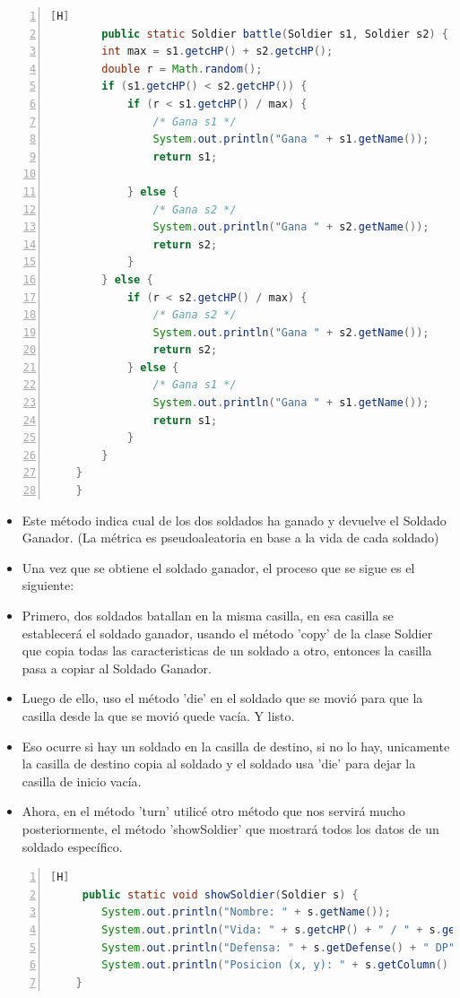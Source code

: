 \documentclass{article}
\begin{document}
	\begin{lstlisting}[language=java,caption={Método battle}, numbers=left][H]
		public static Soldier battle(Soldier s1, Soldier s2) {
        int max = s1.getcHP() + s2.getcHP();
        double r = Math.random();
        if (s1.getcHP() < s2.getcHP()) {
            if (r < s1.getcHP() / max) {
                /* Gana s1 */
                System.out.println("Gana " + s1.getName());
                return s1;

            } else {
                /* Gana s2 */
                System.out.println("Gana " + s2.getName());
                return s2;
            }
        } else {
            if (r < s2.getcHP() / max) {
                /* Gana s2 */
                System.out.println("Gana " + s2.getName());
                return s2;
            } else {
                /* Gana s1 */
                System.out.println("Gana " + s1.getName());
                return s1;
            }
        }
    }
    }
	\end{lstlisting}
	\begin{itemize}	
		\item Este método indica cual de los dos soldados ha ganado y devuelve el Soldado Ganador. (La métrica es pseudoaleatoria en base a la vida de cada soldado)
		\item Una vez que se obtiene el soldado ganador, el proceso que se sigue es el siguiente:
		\item Primero, dos soldados batallan en la misma casilla, en esa casilla se establecerá el soldado ganador, usando el método 'copy' de la clase Soldier que copia todas las caracteristicas de un soldado a otro, entonces la casilla pasa a copiar al Soldado Ganador.
		\item Luego de ello, uso el método 'die' en el soldado que se movió para que la casilla desde la que se movió quede vacía. Y listo.
		\item Eso ocurre si hay un soldado en la casilla de destino, si no lo hay, unicamente la casilla de destino copia al soldado y el soldado usa 'die' para dejar la casilla de inicio vacía.
		\item Ahora, en el método 'turn' utilicé otro método que nos servirá mucho posteriormente, el método 'showSoldier' que mostrará todos los datos de un soldado específico.
	\end{itemize}
	\begin{lstlisting}[language=java,caption={Show Soldier}, numbers=left][H]
	 public static void showSoldier(Soldier s) {
        System.out.println("Nombre: " + s.getName());
        System.out.println("Vida: " + s.getcHP() + " / " + s.getMaxHP() + " HP");
        System.out.println("Defensa: " + s.getDefense() + " DP");
        System.out.println("Posicion (x, y): " + s.getColumn() + " - " + s.getRow() + "\n");
    }
	\end{lstlisting}
	
\end{document}
